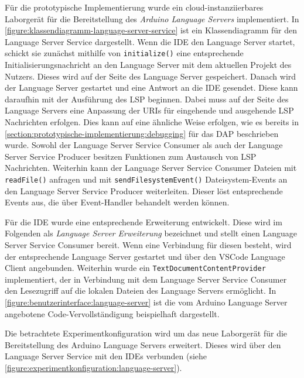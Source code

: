 Für die prototypische Implementierung wurde ein cloud-instanziierbares Laborgerät für die Bereitstellung des \textit{Arduino Language Servers} \cite{noauthor_arduino-language-server_2025} implementiert. In \autoref{figure:klassendiagramm-language-server-service} ist ein Klassendiagramm für den Language Server Service dargestellt. Wenn die IDE den Language Server startet, schickt sie zunächst mithilfe von \texttt{initialize()} eine entsprechende Initialisierungsnachricht an den Language Server mit dem aktuellen Projekt des Nutzers. Dieses wird auf der Seite des Language Server gespeichert. Danach wird der Language Server gestartet und eine Antwort an die IDE gesendet. Diese kann daraufhin mit der Ausführung des \ac{LSP} beginnen. Dabei muss auf der Seite des Language Servers eine Anpassung der URIs für eingehende und ausgehende \ac{LSP} Nachrichten erfolgen. Dies kann auf eine ähnliche Weise erfolgen, wie es bereits in \autoref{section:prototypische-implementierung:debugging} für das \ac{DAP} beschrieben wurde. Sowohl der Language Server Service Consumer als auch der Language Server Service Producer besitzen Funktionen zum Austausch von LSP Nachrichten. Weiterhin kann der Language Server Service Consumer Dateien mit \texttt{readFile()} anfragen und mit \texttt{sendFilesystemEvent()} Dateisystem-Events an den Language Server Service Producer weiterleiten. Dieser löst entsprechende Events aus, die über Event-Handler behandelt werden können.

Für die IDE wurde eine entsprechende Erweiterung entwickelt. Diese wird im Folgenden als \textit{Language Server Erweiterung} bezeichnet und stellt einen Language Server Service Consumer bereit. Wenn eine Verbindung für diesen besteht, wird der entsprechende Language Server gestartet und über den VSCode Language Client angebunden. Weiterhin wurde ein \texttt{TextDocumentContentProvider} implementiert, der in Verbindung mit dem Language Server Service Consumer den Lesezugriff auf die lokalen Dateien des Language Servers ermöglicht. In \autoref{figure:benutzerinterface:language-server} ist die vom Arduino Language Server angebotene Code-Vervollständigung beispielhaft dargestellt.

Die betrachtete Experimentkonfiguration wird um das neue Laborgerät für die Bereitstellung des Arduino Language Servers erweitert. Dieses wird über den Language Server Service mit den IDEs verbunden (siehe \autoref{figure:experimentkonfiguration:language-server}).